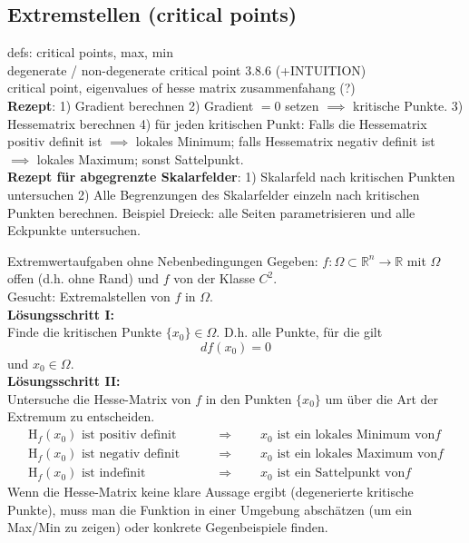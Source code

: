 
\subsection{Extremstellen (critical points)}

defs: critical points, max, min\\

degenerate / non-degenerate critical point 3.8.6 (+INTUITION)\\

critical point, eigenvalues of hesse matrix zusammenfahang (?)\\

\textbf{Rezept}: 1) Gradient berechnen 2) Gradient $=0$ setzen $\implies$ kritische Punkte. 3) Hessematrix berechnen 4) für jeden kritischen Punkt: Falls die Hessematrix positiv definit ist $\implies$ lokales Minimum; falls Hessematrix negativ definit ist $\implies$ lokales Maximum; sonst Sattelpunkt.\\

\textbf{Rezept für abgegrenzte Skalarfelder}: 1) Skalarfeld nach kritischen Punkten untersuchen 2) Alle Begrenzungen des Skalarfelder einzeln nach kritischen Punkten berechnen. Beispiel Dreieck: alle Seiten parametrisieren und alle Eckpunkte untersuchen.

\begin{Rezept}[label=R1]{Extremwertaufgaben ohne Nebenbedingungen}{}
	Gegeben: $f:\Omega\subset \mathbb{R}^n \to \mathbb{R}$ mit $\Omega$ offen (d.h. ohne Rand) und $f$ von der Klasse $C^2$.\\
	Gesucht: Extremalstellen von $f$ in $\Omega$.\\
	\newline
	\textbf{Lösungsschritt I:}\\
	Finde die kritischen Punkte $\{x_0\} \in \Omega$. D.h. alle Punkte, für die gilt
	\begin{equation*}
	df(x_0)=0
	\end{equation*}
	und $x_0 \in \Omega$.\\
	\textbf{Lösungsschritt II:}\\
	Untersuche die Hesse-Matrix von $f$ in den Punkten $\{x_0\}$ um über die Art der Extremum zu entscheiden.
	\begin{align*}
	\text{H}_f(x_0) \text{ ist positiv definit} \qquad &\Rightarrow \qquad x_0 \text{ ist ein lokales Minimum von} f\\
	\text{H}_f(x_0) \text{ ist negativ definit} \qquad &\Rightarrow \qquad x_0 \text{ ist ein lokales Maximum von} f\\
	\text{H}_f(x_0) \text{ ist indefinit} \qquad &\Rightarrow \qquad x_0 \text{ ist ein Sattelpunkt von} f
	\end{align*}
	Wenn die Hesse-Matrix keine klare Aussage ergibt (degenerierte kritische Punkte), muss man die Funktion in einer Umgebung abschätzen (um ein Max/Min zu zeigen) oder konkrete Gegenbeispiele finden.
\end{Rezept}

